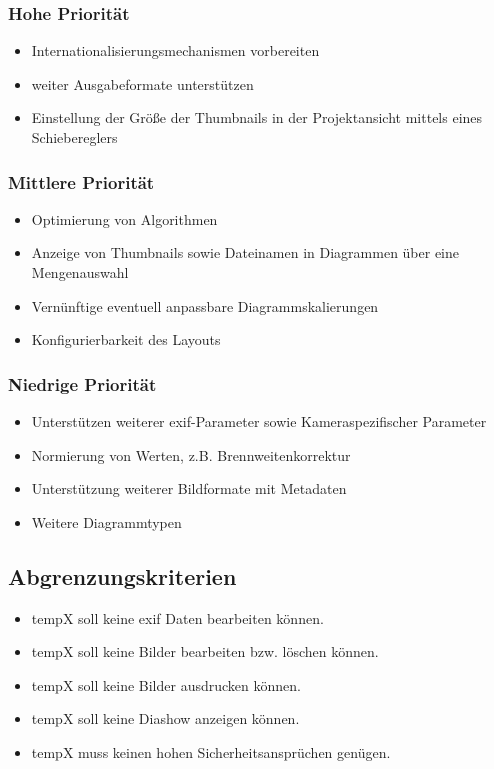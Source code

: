 \subsubsection{Hohe Priorität}
	\begin{itemize}
	\item Internationalisierungsmechanismen vorbereiten
	\item weiter Ausgabeformate unterstützen 
	\item Einstellung der Größe der Thumbnails in der Projektansicht mittels eines Schiebereglers
	\end{itemize}
\subsubsection{Mittlere Priorität}
	\begin{itemize}
	\item Optimierung von Algorithmen
	\item Anzeige von Thumbnails sowie Dateinamen in Diagrammen über eine Mengenauswahl
	\item Vernünftige eventuell anpassbare Diagrammskalierungen
	\item Konfigurierbarkeit des Layouts	
	\end{itemize}
\subsubsection{Niedrige Priorität}
	\begin{itemize}
	\item Unterstützen weiterer \gls{exif}-Parameter sowie Kameraspezifischer Parameter
	\item Normierung von Werten, z.B. Brennweitenkorrektur
 	\item Unterstützung weiterer Bildformate mit Metadaten 	
 	\item Weitere Diagrammtypen
	\end{itemize}


\subsection{Abgrenzungskriterien} 
\begin{itemize}
	\item \gls{tempX} soll keine \gls{exif} Daten bearbeiten können.
	\item \gls{tempX} soll keine Bilder bearbeiten bzw. löschen können.
	\item \gls{tempX} soll keine Bilder ausdrucken können.
	\item \gls{tempX} soll keine Diashow anzeigen können.
	\item \gls{tempX} muss keinen hohen Sicherheitsansprüchen genügen.
\end{itemize}
